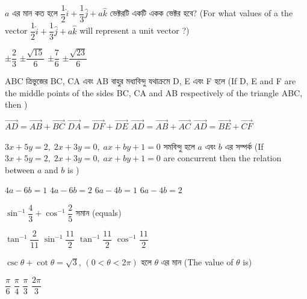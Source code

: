 \documentclass[addpoints]{exam}
\begin{document}
\begin{questions}
\question $ a $ এর মান কত হলে $ \dfrac{1}{2}\hat{i} + \dfrac{1}{3}\hat{j}+a\hat{k} $ ভেক্টরটি একটি একক ভেক্টর হবে? (For what values of a the vector $ \dfrac{1}{2}\hat{i} + \dfrac{1}{3}\hat{j}+a\hat{k} $ will represent a unit vector ?)

\begin{oneparchoices}
\choice $ \pm \dfrac{2}{3} $
\choice $ \pm \dfrac{\sqrt{15}}{6} $
\choice $ \pm \dfrac{7}{6} $
\choice  $ \pm \dfrac{\sqrt{23}}{6} $

\end{oneparchoices}

\question ABC  ত্রিভুজের BC, CA এবং AB বাহুর মধ্যবিন্দু যথাক্রমে D, E এবং F হলে (If D, E and F are the middle points of the sides BC, CA and AB respectively of the triangle ABC, then )

\begin{oneparchoices}
\choice $ \vec{AD} = \vec{AB} + \vec{BC} $
\choice $ \vec{DA} = \vec{DF} + \vec{DE} $
\choice $ \vec{AD} = \vec{AB} + \vec{AC} $
\choice $ \vec{AD} = \vec{BE} + \vec{CF} $

\end{oneparchoices}

\question  $ 3x+5y=2,\; 2x+3y=0,\; ax+by+1=0 $ সমবিন্দু হলে $ a $ এবং $ b $ এর সম্পর্ক (If $ 3x+5y=2,\; 2x+3y=0,\; ax+by+1=0 $ are concurrent then the relation between $ a $ and $ b $ is )

\begin{oneparchoices}
\choice $ 4a-6b=1 $
\choice $ 4a-6b=2 $
\choice $ 6a-4b=1 $
\choice $ 6a-4b=2 $

\end{oneparchoices}


\question   $ \sin^{-1}\dfrac{4}{3} + \cos^{-1}\dfrac{2}{5} $ সমান (equals)

\begin{oneparchoices}
\choice $ \tan^{-1}\dfrac{2}{11} $
\choice $ \sin^{-1}\dfrac{11}{2} $
\choice $ \tan^{-1}\dfrac{11}{2} $
\choice $ \cos^{-1}\dfrac{11}{2} $

\end{oneparchoices}

\question  $ \csc\theta + \cot\theta = \sqrt{3} $, $ (0<\theta<2\pi) $ হলে $ \theta $ এর মান (The value of $ \theta $ is) 

\begin{oneparchoices}
\choice $ \dfrac{\pi}{6} $
\choice $ \dfrac{\pi}{4} $
\choice $ \dfrac{\pi}{3} $
\choice $ \dfrac{2\pi}{3} $

\end{oneparchoices}


\end{questions}
\end{document}
